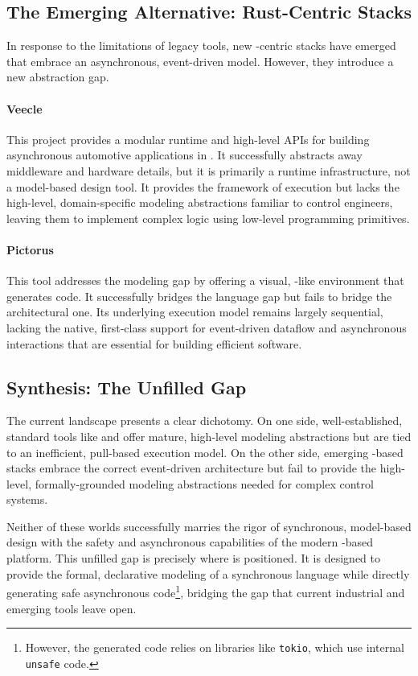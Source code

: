 \subsection{The Emerging Alternative: Rust-Centric Stacks}
\label{sec:sota:tools:rust_stacks}

In response to the limitations of legacy tools, new \Rust-centric stacks have emerged that embrace
an asynchronous, event-driven model. However, they introduce a new abstraction gap.

\paragraph*{Veecle}
This project provides a modular runtime and high-level APIs for building asynchronous automotive
applications in \Rust. It successfully abstracts away middleware and hardware details, but it is
primarily a runtime infrastructure, not a model-based design tool. It provides the framework of
execution but lacks the high-level, domain-specific modeling abstractions familiar to control
engineers, leaving them to implement complex logic using low-level programming primitives.

\paragraph*{Pictorus}
This tool addresses the modeling gap by offering a visual, \Simulink-like environment that generates
\Rust code. It successfully bridges the language gap but fails to bridge the architectural one. Its
underlying execution model remains largely sequential, lacking the native, first-class support for
event-driven dataflow and asynchronous interactions that are essential for building efficient \sdv
software.

\subsection{Synthesis: The Unfilled Gap}
\label{sec:sota:tools:synthesis}

The current landscape presents a clear dichotomy. On one side, well-established, standard tools
like \Simulink and \Scade offer mature, high-level modeling abstractions but are tied to an
inefficient, pull-based execution model. On the other side, emerging \Rust-based stacks embrace the
correct event-driven architecture but fail to provide the high-level, formally-grounded modeling
abstractions needed for complex control systems.

Neither of these worlds successfully marries the rigor of synchronous, model-based design with the
safety and asynchronous capabilities of the modern \Rust-based \sdv platform. This unfilled gap is
precisely where \GRust is positioned. It is designed to provide the formal, declarative modeling of
a synchronous language while directly generating safe asynchronous \Rust code\footnote{However, the
  generated code relies on libraries like \texttt{tokio}, which use internal \texttt{unsafe} code.},
bridging the gap that current industrial and emerging tools leave open.

